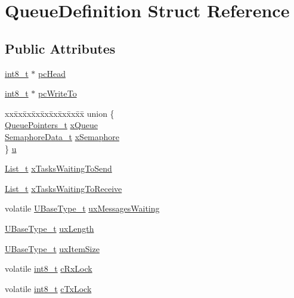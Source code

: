 \hypertarget{structQueueDefinition}{}\section{Queue\+Definition Struct Reference}
\label{structQueueDefinition}
\subsection*{Public Attributes}
\begin{DoxyCompactItemize}
\item 
\hyperlink{stdint_8h_aef44329758059c91c76d334e8fc09700}{int8\+\_\+t} $\ast$ \hyperlink{structQueueDefinition_a487dc7e43b380c58212cba72bc33e0ed}{pc\+Head}
\item 
\hyperlink{stdint_8h_aef44329758059c91c76d334e8fc09700}{int8\+\_\+t} $\ast$ \hyperlink{structQueueDefinition_abdf13cc013c8488848cee3fce4f0fed3}{pc\+Write\+To}
\item 
\begin{tabbing}
xx\=xx\=xx\=xx\=xx\=xx\=xx\=xx\=xx\=\kill
union \{\\
\>\hyperlink{queue_8c_ad04ba6edfecdbdee6406cdd62a72671c}{QueuePointers\_t} \hyperlink{structQueueDefinition_aea4a2daf33054ff6b535f158bd4007f0}{xQueue}\\
\>\hyperlink{queue_8c_a37643b46fd5893e70242848a22aef310}{SemaphoreData\_t} \hyperlink{structQueueDefinition_adb2c0818274974553c619ff953b6f477}{xSemaphore}\\
\} \hyperlink{structQueueDefinition_a23e83b160ae20e3e6d4b7a78203cd45d}{u}\\

\end{tabbing}\item 
\hyperlink{list_8h_afd590ef6400071b4d63d65ef90bea7f4}{List\+\_\+t} \hyperlink{structQueueDefinition_aaab135c4345cb0393d6ff3cd5164c7b2}{x\+Tasks\+Waiting\+To\+Send}
\item 
\hyperlink{list_8h_afd590ef6400071b4d63d65ef90bea7f4}{List\+\_\+t} \hyperlink{structQueueDefinition_af6d61526f77beee659cd604a0c473359}{x\+Tasks\+Waiting\+To\+Receive}
\item 
volatile \hyperlink{pic32mx_2portmacro_8h_a646f89d4298e4f5afd522202b11cb2e6}{U\+Base\+Type\+\_\+t} \hyperlink{structQueueDefinition_a12b07a40152d0f21488ca06d362d13d1}{ux\+Messages\+Waiting}
\item 
\hyperlink{pic32mx_2portmacro_8h_a646f89d4298e4f5afd522202b11cb2e6}{U\+Base\+Type\+\_\+t} \hyperlink{structQueueDefinition_ae80d17a812c669d4d41265b7f693988c}{ux\+Length}
\item 
\hyperlink{pic32mx_2portmacro_8h_a646f89d4298e4f5afd522202b11cb2e6}{U\+Base\+Type\+\_\+t} \hyperlink{structQueueDefinition_a81bb7d3826909244baa9debf5a55abb0}{ux\+Item\+Size}
\item 
volatile \hyperlink{stdint_8h_aef44329758059c91c76d334e8fc09700}{int8\+\_\+t} \hyperlink{structQueueDefinition_ac750a3f75a6e174adbc697e473a0dd13}{c\+Rx\+Lock}
\item 
volatile \hyperlink{stdint_8h_aef44329758059c91c76d334e8fc09700}{int8\+\_\+t} \hyperlink{structQueueDefinition_a24ac3f0707f098da2a22244d843fcf82}{c\+Tx\+Lock}
\end{DoxyCompactItemize}


